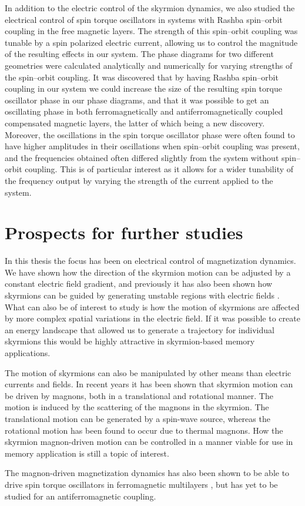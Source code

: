 In addition to the electric control of the skyrmion dynamics, we also studied the electrical control of spin torque oscillators in systems with Rashba spin--orbit coupling in the free magnetic layers. The strength of this spin--orbit coupling was tunable by a spin polarized electric current, allowing us to control the magnitude of the resulting effects in our system. The phase diagrams for two different geometries were calculated analytically and numerically for varying strengths of the spin--orbit coupling. It was discovered that by having Rashba spin--orbit coupling in our system we could increase the size of the resulting spin torque oscillator phase in our phase diagrams, and that it was possible to get an oscillating phase in both ferromagnetically and antiferromagnetically coupled compensated magnetic layers, the latter of which being a new discovery. Moreover, the oscillations in the spin torque oscillator phase were often found to have higher amplitudes in their oscillations when spin--orbit coupling was present, and the frequencies obtained often differed slightly from the system without spin--orbit coupling. This is of particular interest as it allows for a wider tunability of the frequency output by varying the strength of the current applied to the system.

\section{Prospects for further studies}
In this thesis the focus has been on electrical control of magnetization dynamics. We have shown how the direction of the skyrmion motion can be adjusted by a constant electric field gradient, and previously it has also been shown how skyrmions can be guided by generating unstable regions with electric fields \cite{Upadhyaya2015}. What can also be of interest to study is how the motion of skyrmions are affected by more complex spatial variations in the electric field. If it was possible to create an energy landscape that allowed us to generate a trajectory for individual skyrmions this would be highly attractive in skyrmion-based memory applications. 

The motion of skyrmions can also be manipulated by other means than electric currents and fields. In recent years it has been shown that skyrmion motion can be driven by magnons, both in a translational \cite{Iwasaki2014} and rotational \cite{Mochizuki2014} manner. The motion is induced by the scattering of the magnons in the skyrmion. The translational motion can be generated by a spin-wave source, whereas the rotational motion has been found to occur due to thermal magnons. How the skyrmion magnon-driven motion can be controlled in a manner viable for use in memory application is still a topic of interest. 

The magnon-driven magnetization dynamics has also been shown to be able to drive spin torque oscillators in ferromagnetic multilayers \cite{Bender2016}, but has yet to be studied for an antiferromagnetic coupling.